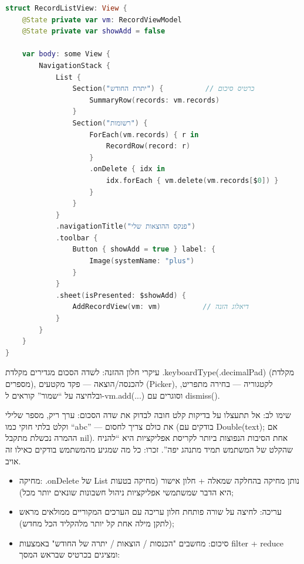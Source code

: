 
\begin{lstlisting}[language=Swift]
struct RecordListView: View {
    @State private var vm: RecordViewModel
    @State private var showAdd = false

    var body: some View {
        NavigationStack {
            List {
                Section("יתרת החודש") {          // כרטיס סיכום
                    SummaryRow(records: vm.records)
                }
                Section("רשומות") {
                    ForEach(vm.records) { r in
                        RecordRow(record: r)
                    }
                    .onDelete { idx in
                        idx.forEach { vm.delete(vm.records[$0]) }
                    }
                }
            }
            .navigationTitle("פנקס ההוצאות שלי")
            .toolbar {
                Button { showAdd = true } label: {
                    Image(systemName: "plus")
                }
            }
            .sheet(isPresented: $showAdd) {
                AddRecordView(vm: vm)          // דיאלוג הזנה
            }
        }
    }
}
\end{lstlisting}

עיקרי חלון ההזנה: לשדה הסכום מגדירים מקלדת .keyboardType(.decimalPad) (מקלדת מספרים), להכנסה/הוצאה — פקד מקטעים (Picker), לקטגוריה — בחירה מתפריט, ובלחיצה על “שמור” קוראים ל-vm.add(...) וסוגרים עם dismiss().

\begin{tcbwarn}{שימו לב: אל תתעצלו על בדיקות קלט}
חובה לבדוק את שדה הסכום: ערך ריק, מספר שלילי וקלט בלתי חוקי כמו “abc” — את כולם צריך לחסום (בודקים עם Double(text); אם ההמרה נכשלת מתקבל nil). אחת הסיבות הנפוצות ביותר לקריסת אפליקציות היא “להניח שהקלט של המשתמש תמיד מתנהג יפה”. זכרו: כל מה שמגיע מהמשתמש בודקים כאילו זה אויב.

\end{tcbwarn}


\begin{itemize}
  \item מחיקה: .onDelete של List נותן מחיקה בהחלקה שמאלה + חלון אישור (מחיקה בטעות היא הדבר שמשתמשי אפליקציות ניהול חשבונות שונאים יותר מכל);
  \item עריכה: לחיצה על שורה פותחת חלון עריכה עם הערכים המקוריים ממולאים מראש (לתקן מילה אחת קל יותר מלהקליד הכל מחדש);
  \item סיכום: מחשבים "הכנסות / הוצאות / יתרה של החודש" באמצעות filter + reduce ומציגים בכרטיס שבראש המסך:
\end{itemize}

